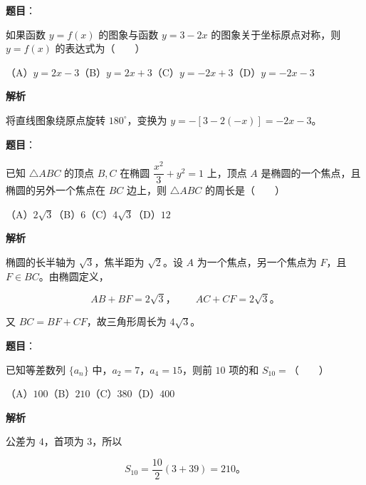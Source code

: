 \begin{answer}

\textbf{题目}：

如果函数 $y=f(x)$ 的图象与函数 $y=3-2x$ 的图象关于坐标原点对称，则 $y=f(x)$ 的表达式为\mbox{（　　）}

（A）$y=2x-3$\quad（B）$y=2x+3$\quad（C）$y=-2x+3$\quad（D）$y=-2x-3$

\textbf{解析}

将直线图象绕原点旋转 $180^\circ$，变换为 $y=-[3-2(-x)]=-2x-3$。


\end{answer}
\begin{answer}

\textbf{题目}：

已知 $\triangle ABC$ 的顶点 $B,C$ 在椭圆 $\dfrac{x^2}{3}+y^2=1$ 上，顶点 $A$ 是椭圆的一个焦点，且椭圆的另外一个焦点在 $BC$ 边上，则 $\triangle ABC$ 的周长是\mbox{（　　）}

（A）$2\sqrt3$\quad（B）$6$\quad（C）$4\sqrt3$\quad（D）$12$

\textbf{解析}

椭圆的长半轴为 $\sqrt3$，焦半距为 $\sqrt2$。设 $A$ 为一个焦点，另一个焦点为 $F$，且 $F\in BC$。由椭圆定义，

\nopagebreak[4]
\[
AB+BF=2\sqrt3\text{，}\qquad AC+CF=2\sqrt3\text{。}
\]

又 $BC=BF+CF$，故三角形周长为 $4\sqrt3$。


\end{answer}
\begin{answer}

\textbf{题目}：

已知等差数列 $\{a_n\}$ 中，$a_2=7$，$a_4=15$，则前 $10$ 项的和 $S_{10}=$\mbox{（　　）}

（A）$100$\quad（B）$210$\quad（C）$380$\quad（D）$400$

\textbf{解析}

公差为 $4$，首项为 $3$，所以

\nopagebreak[4]
\[
S_{10}=\frac{10}{2}(3+39)=210\text{。}
\]


\end{answer}
